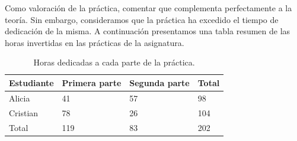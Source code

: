 \documentclass[a4,12pt,onecolum]{article}
\begin{document}
Como valoración de la práctica, comentar que complementa perfectamente a la teoría. Sin embargo, consideramos que la práctica ha excedido el tiempo de dedicación de la misma. A continuación presentamos una tabla resumen de las horas invertidas en las prácticas de la asignatura. \\

\begin{table}[htbp]
\begin{center}
\begin{tabular}{|p{3.0cm}||p{3.0cm}|p{3.0cm}||p{3.0cm}|}
\hline
Estudiante & Primera parte & Segunda parte & Total \\
\hline \hline
Alicia & 41 & 57 & 98 \\ \hline
Cristian & 78 & 26 & 104 \\ \hline \hline
Total & 119 & 83 & 202 \\ \hline
\end{tabular}
\caption{Horas dedicadas a cada parte de la práctica.}
\label{tabla:sencilla}
\end{center}
\end{table}
\end{document}
